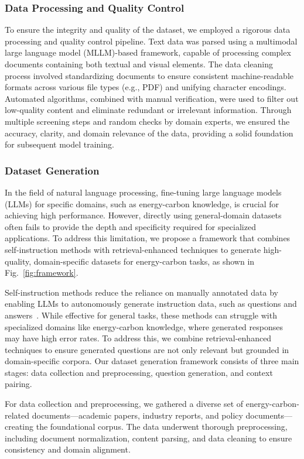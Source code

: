 \documentclass[]{interact}
\theoremstyle{plain}%
\theoremstyle{definition}
\theoremstyle{remark}
\begin{document}
\subsubsection{Data Processing and Quality Control}

To ensure the integrity and quality of the dataset, we employed a rigorous data processing and quality control pipeline. Text data was parsed using a multimodal large language model (MLLM)-based framework, capable of processing complex documents containing both textual and visual elements. The data cleaning process involved standardizing documents to ensure consistent machine-readable formats across various file types (e.g., PDF) and unifying character encodings. Automated algorithms, combined with manual verification, were used to filter out low-quality content and eliminate redundant or irrelevant information. Through multiple screening steps and random checks by domain experts, we ensured the accuracy, clarity, and domain relevance of the data, providing a solid foundation for subsequent model training.

\subsubsection{ Dataset Generation}
In the field of natural language processing, fine-tuning large language models (LLMs) for specific domains, such as energy-carbon knowledge, is crucial for achieving high performance. However, directly using general-domain datasets often fails to provide the depth and specificity required for specialized applications. To address this limitation, we propose a framework that combines self-instruction methods with retrieval-enhanced techniques to generate high-quality, domain-specific datasets for energy-carbon tasks, as shown in Fig.~\ref{fig:framework}.

Self-instruction methods reduce the reliance on manually annotated data by enabling LLMs to autonomously generate instruction data, such as questions and answers~\cite{wang2022self}. While effective for general tasks, these methods can struggle with specialized domains like energy-carbon knowledge, where generated responses may have high error rates. To address this, we combine retrieval-enhanced techniques to ensure generated questions are not only relevant but grounded in domain-specific corpora. Our dataset generation framework consists of three main stages: data collection and preprocessing, question generation, and context pairing.

For data collection and preprocessing, we gathered a diverse set of energy-carbon-related documents—academic papers, industry reports, and policy documents—creating the foundational corpus. The data underwent thorough preprocessing, including document normalization, content parsing, and data cleaning to ensure consistency and domain alignment.
\end{document}
